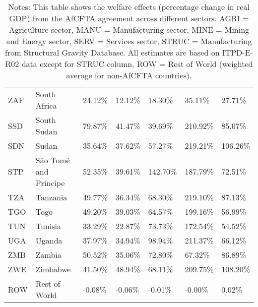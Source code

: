 \begin{table}[htbp]
\begin{tabular}{lllllll}
  ZAF & South Africa & 24.12\% & 12.12\% & 18.30\% & 35.11\% & 27.71\% \\ 
  SSD & South Sudan & 79.87\% & 41.47\% & 39.69\% & 210.92\% & 85.07\% \\ 
  SDN & Sudan & 35.64\% & 37.62\% & 57.27\% & 219.21\% & 106.26\% \\ 
  STP & São Tomé and Príncipe & 52.35\% & 39.61\% & 142.70\% & 187.79\% & 72.51\% \\ 
  TZA & Tanzania & 49.77\% & 36.34\% & 68.30\% & 219.10\% & 87.13\% \\ 
  TGO & Togo & 49.20\% & 39.03\% & 64.57\% & 199.16\% & 56.99\% \\ 
  TUN & Tunisia & 33.29\% & 22.87\% & 73.73\% & 172.54\% & 54.52\% \\ 
  UGA & Uganda & 37.97\% & 34.94\% & 98.94\% & 211.37\% & 66.12\% \\ 
  ZMB & Zambia & 50.52\% & 35.06\% & 72.80\% & 67.32\% & 86.89\% \\ 
  ZWE & Zimbabwe & 41.50\% & 48.94\% & 68.11\% & 209.75\% & 108.20\% \\ 
  ROW & Rest of World & -0.08\% & -0.06\% & -0.01\% & -0.00\% & 0.02\% \\ 
   \hline  \hline
\end{tabular}
\endgroup
\caption*{Notes: This table shows the welfare effects (percentage change in real GDP) from the AfCFTA agreement across different sectors. AGRI = Agriculture sector, MANU = Manufacturing sector, MINE = Mining and Energy sector, SERV = Services sector, STRUC = Manufacturing from Structural Gravity Database. All estimates are based on ITPD-E-R02 data except for STRUC column. ROW = Rest of World (weighted average for non-AfCFTA countries).}
\end{table}


